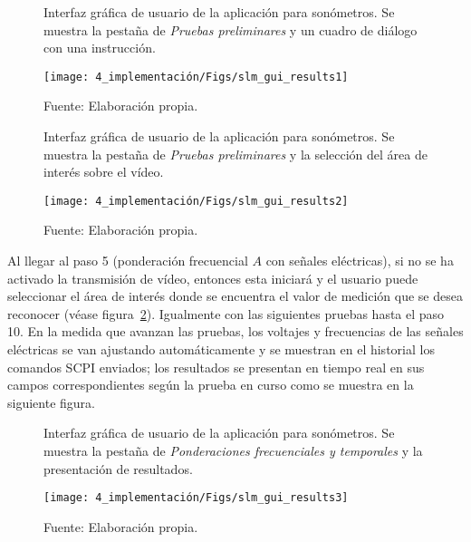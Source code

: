 \begin{figure}[!h]
    \centering
    \caption{Interfaz gráfica de usuario de la aplicación para sonómetros. Se muestra la pestaña de \emph{Pruebas preliminares} y un cuadro de diálogo con una instrucción.}
    \label{fig:slm_gui_results1}
    \texttt{[image: 4\_implementación/Figs/slm\_gui\_results1]}
    \caption*{\footnotesize Fuente: Elaboración propia.}
\end{figure}

\begin{figure}[!h]
    \centering
    \caption{Interfaz gráfica de usuario de la aplicación para sonómetros. Se muestra la pestaña de \emph{Pruebas preliminares} y la selección del área de interés sobre el vídeo.}
    \label{fig:slm_gui_results2}
    \texttt{[image: 4\_implementación/Figs/slm\_gui\_results2]}
    \caption*{\footnotesize Fuente: Elaboración propia.}
\end{figure}

\vfill
\clearpage

Al llegar al paso 5 (ponderación frecuencial $A$ con señales eléctricas), si no se ha activado la transmisión de vídeo, entonces esta iniciará y el usuario puede seleccionar el área de interés donde se encuentra el valor de medición que se desea reconocer (véase figura~\ref{fig:slm_gui_results2}).
Igualmente con las siguientes pruebas hasta el paso 10.
En la medida que avanzan las pruebas, los voltajes y frecuencias de las señales eléctricas se van ajustando automáticamente y se muestran en el historial los comandos SCPI enviados;
los resultados se presentan en tiempo real en sus campos correspondientes según la prueba en curso como se muestra en la siguiente figura.

\begin{figure}[!h]
    \centering
    \caption{Interfaz gráfica de usuario de la aplicación para sonómetros. Se muestra la pestaña de \emph{Ponderaciones frecuenciales y temporales} y la presentación de resultados.}
    \label{fig:slm_gui_results3}
    \texttt{[image: 4\_implementación/Figs/slm\_gui\_results3]}
    \caption*{\footnotesize Fuente: Elaboración propia.}
\end{figure}

\vfill
\clearpage
